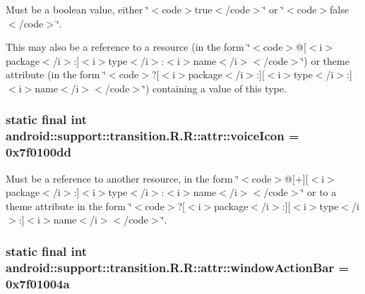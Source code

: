 Must be a boolean value, either \char`\"{}$<$code$>$true$<$/code$>$\char`\"{} or \char`\"{}$<$code$>$false$<$/code$>$\char`\"{}. 

This may also be a reference to a resource (in the form \char`\"{}$<$code$>$@\mbox{[}$<$i$>$package$<$/i$>$:\mbox{]}$<$i$>$type$<$/i$>$:$<$i$>$name$<$/i$>$$<$/code$>$\char`\"{}) or theme attribute (in the form \char`\"{}$<$code$>$?\mbox{[}$<$i$>$package$<$/i$>$:\mbox{]}\mbox{[}$<$i$>$type$<$/i$>$:\mbox{]}$<$i$>$name$<$/i$>$$<$/code$>$\char`\"{}) containing a value of this type. \hypertarget{classandroid_1_1support_1_1transition_1_1_r_1_1attr_341844f57069c917f68566987d39ac99}{
\subsubsection[{voiceIcon}]{\setlength{\rightskip}{0pt plus 5cm}static final int android::support::transition.R.R::attr::voiceIcon = 0x7f0100dd}}
\label{classandroid_1_1support_1_1transition_1_1_r_1_1attr_341844f57069c917f68566987d39ac99}


Must be a reference to another resource, in the form \char`\"{}$<$code$>$@\mbox{[}+\mbox{]}\mbox{[}$<$i$>$package$<$/i$>$:\mbox{]}$<$i$>$type$<$/i$>$:$<$i$>$name$<$/i$>$$<$/code$>$\char`\"{} or to a theme attribute in the form \char`\"{}$<$code$>$?\mbox{[}$<$i$>$package$<$/i$>$:\mbox{]}\mbox{[}$<$i$>$type$<$/i$>$:\mbox{]}$<$i$>$name$<$/i$>$$<$/code$>$\char`\"{}. \hypertarget{classandroid_1_1support_1_1transition_1_1_r_1_1attr_3866d25b2712d8fd070b9a8dd6f5df7f}{
\subsubsection[{windowActionBar}]{\setlength{\rightskip}{0pt plus 5cm}static final int android::support::transition.R.R::attr::windowActionBar = 0x7f01004a}}
\label{classandroid_1_1support_1_1transition_1_1_r_1_1attr_3866d25b2712d8fd070b9a8dd6f5df7f}


